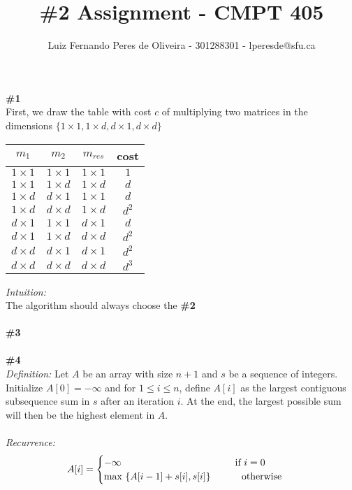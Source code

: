 \documentclass{article}
\title{\#2 Assignment - CMPT 405}
\author{Luiz Fernando Peres de Oliveira - 301288301 - lperesde@sfu.ca}
\newcommand\tab[1][1cm]{\hspace*{#1}}
\begin{document}
\maketitle
\textbf{\#1}
\\
First, we draw the table with cost $c$ of multiplying two matrices in the dimensions $\{ 1 \times 1, 1 \times d, d \times 1, d \times d\}$
\\
\begin{center}
\begin{tabular}{ |c|c|c|c| } 
 \hline
 $m_1$ & $m_2$ & $m_{res}$ & cost \\
 \hline
 $1 \times 1$ & $1 \times 1$ & $1 \times 1$ & $1$ \\
 \hline
 $1 \times 1$ & $1 \times d$ & $1 \times d$ & $d$ \\
 \hline
 $1 \times d$ & $d \times 1$ & $1 \times 1$ & $d$ \\
 \hline
 $1 \times d$ & $d \times d$ & $1 \times d$ & $d^2$ \\
 \hline
 $d \times 1$ & $1 \times 1$ & $d \times 1$ & $d$ \\
 \hline
 $d \times 1$ & $1 \times d$ & $d \times d$ & $d^2$ \\
 \hline
 $d \times d$ & $d \times 1$ & $d \times 1$ & $d^2$ \\
 \hline
 $d \times d$ & $d \times d$ & $d \times d$ & $d^3$ \\
 \hline
\end{tabular}
\end{center}
\textit{Intuition:}
\\
The algorithm should always choose the 
\textbf{\#2}
\\
\\
\textbf{\#3}
\\
\\
\textbf{\#4}\\
\textit{Definition:} Let $A$ be an array with size $n+1$ and $s$ be a sequence of integers. Initialize $A[0] = - \infty$ and for $1 \leq i \leq n$, define $A[i]$ as the largest contiguous subsequence sum in $s$ after an iteration $i$.  At the end, the largest possible sum will then be the highest element in $A$.\\
\\
\textit{Recurrence:}
\begin{gather*}
A[i] =
\begin{cases}
-\infty \tab\tab\tab\tab\text{   } $if $i = 0 \\
\text{max } \{A[i-1] + s[i], s[i]\} \tab $ otherwise $
\end{cases}
\end{gather*}\\
\end{document}
